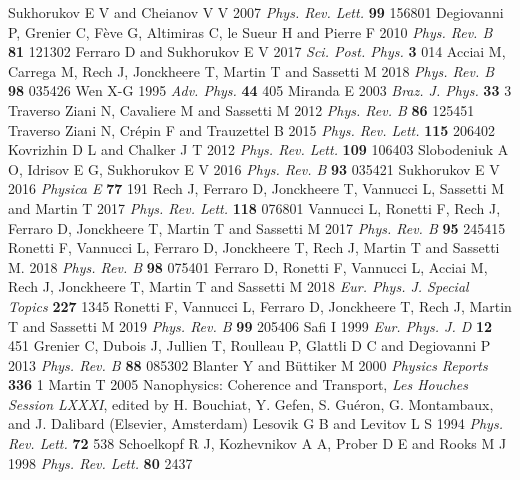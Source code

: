 \documentclass[12pt]{iopart}
\begin{document}
\begin{thebibliography}{999}
%
 Sukhorukov E V and Cheianov V V 2007 \emph{Phys. Rev. Lett.} \textbf{99} 156801
%
 Degiovanni P, Grenier C, F\`eve G, Altimiras C, le Sueur H and Pierre F 2010 \emph{Phys. Rev. B} \textbf{81} 121302 
%
 Ferraro D and Sukhorukov E V 2017 \emph{Sci. Post. Phys.} \textbf{3} 014
%
 Acciai M, Carrega M, Rech J, Jonckheere T, Martin T and Sassetti M 2018 \emph{Phys. Rev. B} \textbf{98} 035426
%
 Wen X-G 1995 \emph{Adv. Phys.} \textbf{44} 405
%
 Miranda E 2003 \emph{Braz. J. Phys.} \textbf{33} 3
%
 Traverso Ziani N, Cavaliere M and Sassetti M 2012 \emph{Phys. Rev. B} \textbf{86} 125451
%
 Traverso Ziani N, Cr\'epin F and Trauzettel B 2015 \emph{Phys. Rev. Lett.} \textbf{115} 206402
%
 Kovrizhin D L and Chalker J T 2012 \emph{Phys. Rev. Lett.} \textbf{109} 106403
%
 Slobodeniuk A O, Idrisov E G, Sukhorukov E V 2016 {\em Phys. Rev. B} {\bf 93} 035421
%
%
 Sukhorukov E V 2016 \emph{Physica E} \textbf{77} 191 
%
 Rech J, Ferraro D, Jonckheere T, Vannucci L, Sassetti M and Martin T 2017 {\em Phys. Rev. Lett. } {\bf 118} 076801
%
 Vannucci L, Ronetti F, Rech J, Ferraro D, Jonckheere T, Martin T and Sassetti M 2017 {\em Phys. Rev. B} {\bf 95} 245415
%
 Ronetti F, Vannucci L, Ferraro D, Jonckheere T, Rech J, Martin T and Sassetti M. 2018 {\em Phys. Rev. B} {\bf 98} 075401
%
 Ferraro D, Ronetti F, Vannucci L, Acciai M, Rech J, Jonckheere T, Martin T and Sassetti M
2018 \emph{Eur. Phys. J. Special Topics} \textbf{227} 1345
%
 Ronetti F, Vannucci L, Ferraro D, Jonckheere T, Rech J, Martin T and Sassetti M 2019
\emph{Phys. Rev. B} \textbf{99} 205406
%
 Safi I 1999 \emph{Eur. Phys. J. D} \textbf{12} 451
%
 Grenier C, Dubois J, Jullien T, Roulleau P, Glattli D C and Degiovanni P 2013 \emph{Phys. Rev. B} \textbf{88} 085302
%
 Blanter Y and B\"uttiker M 2000 \emph{Physics Reports} \textbf{336} 1
%
 Martin T 2005 Nanophysics: Coherence and Transport, \emph{Les Houches Session LXXXI}, edited by H. Bouchiat, Y. Gefen, S. Gu\'eron, G. Montambaux, and J. Dalibard (Elsevier, Amsterdam)
%
 Lesovik G B and Levitov L S 1994 \emph{Phys. Rev. Lett.} \textbf{72} 538
%
 Schoelkopf R J, Kozhevnikov A A, Prober D E and Rooks M J 1998 \emph{Phys. Rev. Lett.} \textbf{80} 2437

\end{thebibliography}
\end{document}

